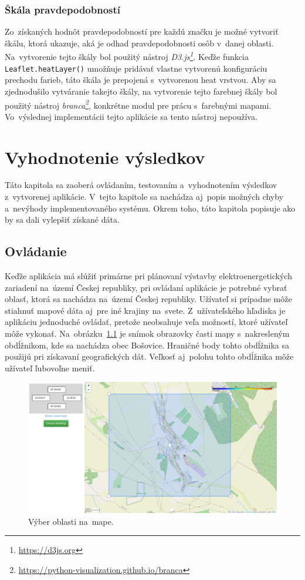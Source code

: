 \subsection*{Škála pravdepodobností}
Zo~získaných hodnôt pravdepodobností pre každú značku je možné vytvoriť škálu, ktorá ukazuje, aká je odhad pravdepodobnosti osôb v~danej oblasti. Na~vytvorenie tejto škály bol použitý nástroj \emph{D3.js\footnote{\url{https://d3js.org}}}. Keďže funkcia \texttt{Leaflet.heatLayer()} umožňuje pridávať vlastne vytvorenú konfiguráciu prechodu farieb, táto škála je prepojená s~vytvorenou heat vrstvou. Aby sa zjednodušilo vytváranie takejto škály, na vytvorenie tejto farebnej škály bol použitý nástroj \emph{branca\footnote{\url{https://python-visualization.github.io/branca}}}, konkrétne modul pre prácu s~farebnými mapami. Vo~výslednej implementácii tejto aplikácie sa tento nástroj nepoužíva.



\chapter{Vyhodnotenie výsledkov}
\label{chap:vyhodnotenie}
Táto kapitola sa zaoberá ovládaním, testovaním a~vyhodnotením výsledkov z~vytvorenej aplikácie. V~tejto kapitole sa nachádza aj~popis možných chyby a~nevýhody implementovaného systému. Okrem toho, táto kapitola popisuje ako by sa dali vylepšiť získané dáta.


\section{Ovládanie}
Keďže aplikácia má slúžiť primárne pri plánovaní výstavby elektroenergetických zariadení na~území Českej republiky, pri ovládaní aplikácie je potrebné vybrať oblasť, ktorá sa nachádza na~území Českej republiky. Užívateľ si prípadne môže stiahnuť mapové dáta aj~pre iné krajiny na~svete. Z~užívateľského hľadiska je aplikáciu jednoduché ovládať, pretože neobsahuje veľa možností, ktoré užívateľ môže vykonať. Na~obrázku~\ref{fig:bosovice-map} je snímok obrazovky časti mapy s~nakresleným obdĺžnikom, kde sa nachádza obec Bošovice. Hraničné body tohto obdĺžnika sa použijú pri získavaní geografických dát. Veľkosť aj~polohu tohto obdĺžnika môže užívateľ ľubovoľne meniť.

\begin{figure}[ht]
    \centering
    \includegraphics[width=1.0\linewidth]{obrazky-figures/bosovice-map.png}
    \caption{Výber oblasti na~mape.}
    \label{fig:bosovice-map}
\end{figure}

